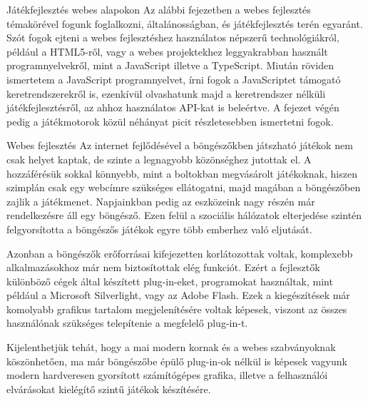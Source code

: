 \begin{MyChapter}{Játékfejlesztés webes alapokon}	
	Az alábbi fejezetben a webes fejlesztés témakörével fogunk foglalkozni, általánosságban, és játékfejlesztés terén egyaránt. Szót fogok ejteni a webes fejlesztéshez használatos népszerű technológiákról, például a HTML5-ről, vagy a webes projektekhez leggyakrabban használt programnyelvekről, mint a JavaScript illetve a TypeScript.
	Miután röviden ismertetem a JavaScript programnyelvet, írni fogok a JavaScriptet támogató keretrendszerekről is, ezenkívül olvashatunk majd a keretrendszer nélküli játékfejlesztésről, az ahhoz használatos API-kat is beleértve. A fejezet végén pedig a játékmotorok közül néhányat picit részletesebben ismertetni fogok.

	\begin{MySection}{Webes fejlesztés}
		Az internet fejlődésével a böngészőkben játszható játékok nem csak helyet kaptak, de szinte a legnagyobb közönséghez jutottak el. A hozzáférésük sokkal könnyebb, mint a boltokban megvásárolt játékoknak, hiszen szimplán csak egy webcímre szükséges ellátogatni, majd magában a böngészőben zajlik a játékmenet. Napjainkban pedig az eszközeink nagy részén már rendelkezésre áll egy böngésző. Ezen felül a szociális hálózatok elterjedése szintén felgyorsította a böngészős játékok egyre több emberhez való eljutását.
		
		
		Azonban a böngészők erőforrásai kifejezetten korlátozottak voltak, komplexebb alkalmazásokhoz már nem biztosítottak elég funkciót. Ezért a fejlesztők különböző cégek által készített plug-in-eket, programokat használtak, mint például a Microsoft Silverlight, vagy az Adobe Flash. Ezek a kiegészítések már komolyabb grafikus tartalom megjelenítésére voltak képesek, viszont az összes használónak szükséges telepítenie a megfelelő plug-in-t. 
		
		Kijelenthetjük tehát, hogy a mai modern kornak és a webes szabványoknak köszönhetően, ma már böngészőbe épülő plug-in-ok nélkül is képesek vagyunk modern hardveresen gyorsított számítógépes grafika, illetve a felhasználói elvárásokat kielégítő szintű játékok készítésére.
	\end{MySection}


\end{MyChapter}
